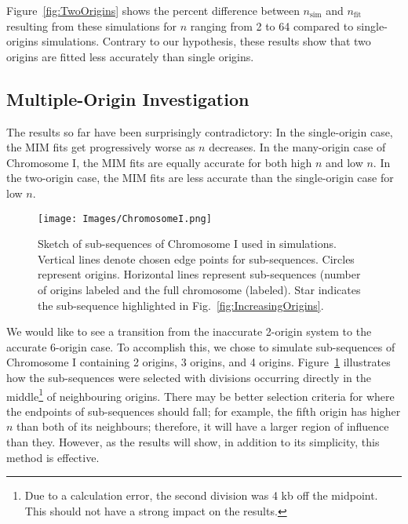 		Figure~\ref{fig:TwoOrigins} shows the percent difference between $n_\text{sim}$ and $n_\text{fit}$ resulting from these simulations for $n$ ranging from 2 to 64 compared to single-origins simulations.
		Contrary to our hypothesis, these results show that two origins are fitted less accurately than single origins.
		
		
		\subsection{Multiple-Origin Investigation}
		
		The results so far have been surprisingly contradictory:
		In the single-origin case, the MIM fits get progressively worse as $n$ decreases.
		In the many-origin case of Chromosome I, the MIM fits are equally accurate for both high $n$ and low $n$.
		In the two-origin case, the MIM fits are less accurate than the single-origin case for low $n$.
		
	\begin{figure}[tbh]
		\begin{center}
			\texttt{[image: Images/ChromosomeI.png]}
		\end{center}
			\caption[Sketch of Sub-sequences of Chromosome I]{\label{fig:ChrISubSeq} 
				Sketch of sub-sequences of Chromosome I used in simulations.
				Vertical lines denote chosen edge points for sub-sequences.
				Circles represent origins.
				Horizontal lines represent sub-sequences (number of origins labeled and the full chromosome (labeled).
				Star indicates the sub-sequence highlighted in Fig.~\ref{fig:IncreasingOrigins}.
			}
	\end{figure} 

		We would like to see a transition from the inaccurate 2-origin system to the accurate 6-origin case.
		To accomplish this, we chose to simulate sub-sequences of Chromosome I containing 2 origins, 3 origins, and 4 origins.
		Figure~\ref{fig:ChrISubSeq} illustrates how the sub-sequences were selected with divisions occurring directly in the middle\footnote{
		Due to a calculation error, the second division was 4 kb off the midpoint. This should not have a strong impact on the results.}
		of neighbouring origins.
		There may be better selection criteria for where the endpoints of sub-sequences should fall;
		for example, the fifth origin has higher $n$ than both of its neighbours; therefore, it will have a larger region of influence than they.
		However, as the results will show, in addition to its simplicity, this method is effective.
		
